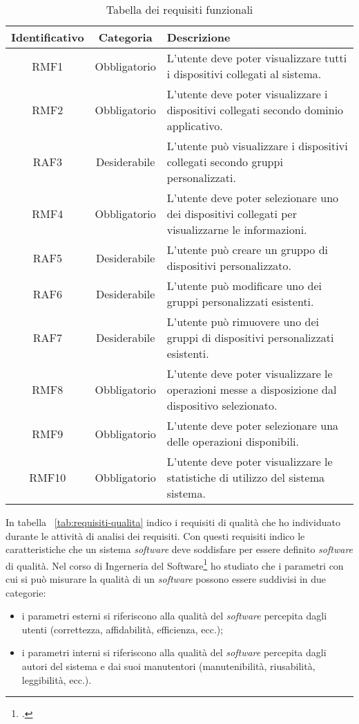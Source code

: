 \begin{table}[H]
\caption{Tabella dei requisiti funzionali}
\label{tab:requisiti-funzionali}
\begin{tabularx}{\linewidth}{|c|c|X|}
\hline
\textbf{Identificativo} & \textbf{Categoria} & \textbf{Descrizione} \\
\hline
RMF1 & Obbligatorio & L'utente deve poter visualizzare tutti i dispositivi collegati al sistema. \\
\hline
RMF2 & Obbligatorio & L'utente deve poter visualizzare i dispositivi collegati secondo dominio applicativo. \\
\hline
RAF3 & Desiderabile & L'utente può visualizzare i dispositivi collegati secondo gruppi personalizzati. \\
\hline
RMF4 & Obbligatorio & L'utente deve poter selezionare uno dei dispositivi collegati per visualizzarne le informazioni. \\
\hline
RAF5 & Desiderabile & L'utente può creare un gruppo di dispositivi personalizzato. \\
\hline
RAF6 & Desiderabile & L'utente può modificare uno dei gruppi personalizzati esistenti. \\
\hline
RAF7 & Desiderabile & L'utente può rimuovere uno dei gruppi di dispositivi personalizzati esistenti. \\
\hline
RMF8 & Obbligatorio & L'utente deve poter visualizzare le operazioni messe a disposizione dal dispositivo selezionato. \\
\hline
RMF9 & Obbligatorio & L'utente deve poter selezionare una delle operazioni disponibili. \\
\hline
RMF10 & Obbligatorio & L'utente deve poter visualizzare le statistiche di utilizzo del sistema sistema. \\
\hline
\end{tabularx}
\end{table}

\newpage

In tabella ~\ref{tab:requisiti-qualita} indico i requisiti di qualità che ho individuato durante le attività di analisi dei requisiti. Con questi requisiti indico le caratteristiche che un sistema \emph{software} deve soddisfare per essere definito \emph{software} di qualità. Nel corso di Ingerneria del Software\footcite{swe-req-qual} ho studiato che i parametri con cui si può misurare la qualità di un \emph{software} possono essere suddivisi in due categorie:
\begin{itemize}
  \item i parametri esterni si riferiscono alla qualità del \emph{software} percepita dagli utenti (correttezza, affidabilità, efficienza, ecc.);
  \item i parametri interni si riferiscono alla qualità del \emph{software} percepita dagli autori del sistema e dai suoi manutentori (manutenibilità, riusabilità, leggibilità, ecc.).
\end{itemize}

